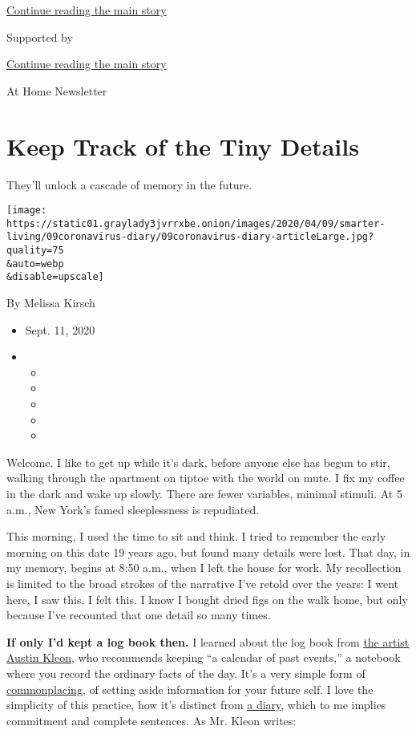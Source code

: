 \protect\hyperlink{after-top}{Continue reading the main story}

Supported by

\protect\hyperlink{after-sponsor}{Continue reading the main story}

At Home Newsletter

\hypertarget{keep-track-of-the-tiny-details}{%
\section{Keep Track of the Tiny
Details}\label{keep-track-of-the-tiny-details}}

They'll unlock a cascade of memory in the future.

\texttt{[image: https://static01.graylady3jvrrxbe.onion/images/2020/04/09/smarter-living/09coronavirus-diary/09coronavirus-diary-articleLarge.jpg?quality=75\\\&auto=webp\\\&disable=upscale]}

By Melissa Kirsch

\begin{itemize}
\item
  Sept. 11, 2020
\item
  \begin{itemize}
  \item
  \item
  \item
  \item
  \item
  \end{itemize}
\end{itemize}

Welcome. I like to get up while it's dark, before anyone else has begun
to stir, walking through the apartment on tiptoe with the world on mute.
I fix my coffee in the dark and wake up slowly. There are fewer
variables, minimal stimuli. At 5 a.m., New York's famed sleeplessness is
repudiated.

This morning, I used the time to sit and think. I tried to remember the
early morning on this date 19 years ago, but found many details were
lost. That day, in my memory, begins at 8:50 a.m., when I left the house
for work. My recollection is limited to the broad strokes of the
narrative I've retold over the years: I went here, I saw this, I felt
this. I know I bought dried figs on the walk home, but only because I've
recounted that one detail so many times.

\textbf{If only I'd kept a log book then.} I learned about the log book
from \href{https://austinkleon.com/2010/01/31/logbook/}{the artist
Austin Kleon}, who recommends keeping ``a calendar of past events,'' a
notebook where you record the ordinary facts of the day. It's a very
simple form of
\href{https://www.wikiwand.com/en/Commonplace_book}{commonplacing}, of
setting aside information for your future self. I love the simplicity of
this practice, how it's distinct from
\href{https://www.nytimes3xbfgragh.onion/2020/04/13/smarter-living/why-you-should-start-a-coronavirus-diary.html}{a
diary}, which to me implies commitment and complete sentences. As Mr.
Kleon writes:

